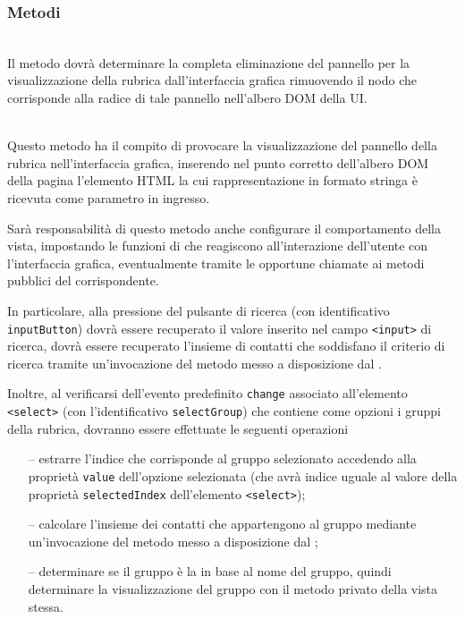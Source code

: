 \subsubsection*{Metodi}
\begin{description}

\item{}\\
Il metodo dovrà determinare la completa eliminazione del pannello per la visualizzazione della rubrica dall'interfaccia grafica rimuovendo il nodo che corrisponde alla radice di tale pannello nell'albero DOM della UI\@.

\item{}\\
Questo metodo ha il compito di provocare la visualizzazione del pannello della rubrica nell'interfaccia grafica, inserendo nel punto corretto dell'albero DOM della pagina l'elemento HTML la cui rappresentazione in formato stringa è ricevuta come parametro in ingresso.

Sarà responsabilità di questo metodo anche configurare il comportamento della vista, impostando le funzioni di  che reagiscono all'interazione dell'utente con l'interfaccia grafica, eventualmente tramite le opportune chiamate ai metodi pubblici del  corrispondente.

In particolare, alla pressione del pulsante di ricerca (con identificativo \verb'inputButton') dovrà essere recuperato il valore inserito nel campo \verb'<input>' di ricerca, dovrà essere recuperato l'insieme di contatti che soddisfano il criterio di ricerca tramite un'invocazione del metodo  messo a disposizione dal .

Inoltre, al verificarsi dell'evento predefinito \verb'change' associato all'elemento  \verb'<select>' (con l'identificativo \verb'selectGroup') che contiene come opzioni i gruppi della rubrica, dovranno essere effettuate le seguenti operazioni
\begin{itemize}
  \item[--] estrarre l'indice che corrisponde al gruppo selezionato accedendo alla proprietà \verb'value' dell'opzione selezionata (che avrà indice uguale al valore della proprietà \verb'selectedIndex' dell'elemento \verb'<select>');
  \item[--] calcolare l'insieme dei contatti che appartengono al gruppo mediante un'invocazione del metodo  messo a disposizione dal ;
  \item[--] determinare se il gruppo è la  in base al nome del gruppo, quindi determinare la visualizzazione del gruppo con il metodo privato  della vista stessa.
\end{itemize}


\end{description}
